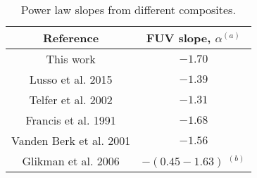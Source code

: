 \begin{table}
\centering
\begin{center}
\caption{Power law slopes from different composites.}
\begin{tabular}{cc}
\hline
\noalign{\smallskip}
Reference &  FUV slope, $\alpha$$^{(a)}$ \\  
\hline


This work  & $-1.70$   \\
Lusso et al. 2015  & $-1.39$   \\
Telfer et al. 2002  & $-1.31$   \\
Francis et al. 1991  & $-1.68 $   \\

Vanden Berk et al. 2001  & $-1.56$   \\
Glikman et al. 2006 & $-(0.45 - 1.63)$ $^{(b)}$  \\
\hline
\hline
\end{tabular}
\end{center}


\end{table}



